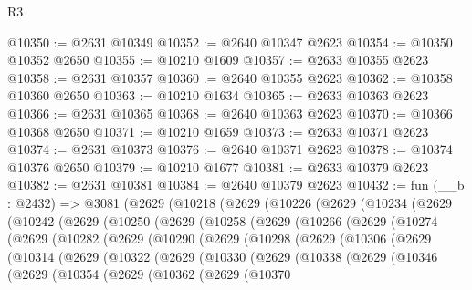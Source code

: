 \begin{lexlean}{R3}
\begin{coremodule}
@10350 := @2631 @10349
@10352 := @2640 @10347 @2623
@10354 := @10350 @10352 @2650
@10355 := @10210 @1609
@10357 := @2633 @10355 @2623
@10358 := @2631 @10357
@10360 := @2640 @10355 @2623
@10362 := @10358 @10360 @2650
@10363 := @10210 @1634
@10365 := @2633 @10363 @2623
@10366 := @2631 @10365
@10368 := @2640 @10363 @2623
@10370 := @10366 @10368 @2650
@10371 := @10210 @1659
@10373 := @2633 @10371 @2623
@10374 := @2631 @10373
@10376 := @2640 @10371 @2623
@10378 := @10374 @10376 @2650
@10379 := @10210 @1677
@10381 := @2633 @10379 @2623
@10382 := @2631 @10381
@10384 := @2640 @10379 @2623
@10432 := fun (__b : @2432) =>
  @3081
    (@2629
      (@10218
        (@2629
          (@10226
            (@2629
              (@10234
                (@2629
                  (@10242
                    (@2629
                      (@10250
                        (@2629
                          (@10258
                            (@2629
                              (@10266
                                (@2629
                                  (@10274
                                    (@2629
                                      (@10282
                                        (@2629
                                          (@10290
                                            (@2629
                                              (@10298
                                                (@2629
                                                  (@10306
                                                    (@2629
                                                      (@10314
                                                        (@2629
                                                          (@10322
                                                            (@2629
                                                              (@10330
                                                                (@2629
                                                                  (@10338
                                                                    (@2629
                                                                      (@10346
                                                                        (@2629
                                                                          (@10354
                                                                            (@2629
                                                                              (@10362
                                                                                (@2629
                                                                                  (@10370

\end{coremodule}
\end{lexlean}

